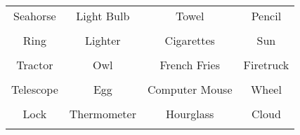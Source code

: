 \documentclass[12pt,a4paper]{article}
\begin{document}
\thispagestyle{empty}
\begin{table}[]
\centering
\Huge
\begin{tabular}{cccc}
 Seahorse& Light Bulb& Towel& Pencil\\  & & & \\
 Ring& Lighter& Cigarettes& Sun\\  & & & \\
 Tractor& Owl& French Fries& Firetruck\\  & & & \\
 Telescope& Egg& Computer Mouse& Wheel\\  & & & \\
 Lock& Thermometer& Hourglass& Cloud\\  & & & \\
\end{tabular}
\end{table}
\end{document}
